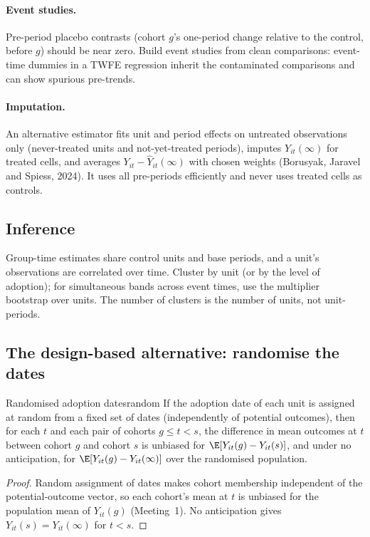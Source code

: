 \documentclass[11pt]{article}
\begin{document}
\paragraph{Event studies.} Pre-period placebo contrasts (cohort $g$'s one-period change relative to the control, before $g$) should be near zero. Build event
studies from clean comparisons: event-time dummies in a TWFE regression inherit the contaminated comparisons and can show spurious pre-trends.

\paragraph{Imputation.} An alternative estimator fits unit and period effects on untreated observations only (never-treated units and not-yet-treated periods),
imputes $Y_{it}(\infty)$ for treated cells, and averages $Y_{it} - \hat Y_{it}(\infty)$ with chosen weights (Borusyak, Jaravel and Spiess, 2024). It uses all
pre-periods efficiently and never uses treated cells as controls.

\subsection{Inference}

Group-time estimates share control units and base periods, and a unit's observations are correlated over time. Cluster by unit (or by the level of adoption);
for simultaneous bands across event times, use the multiplier bootstrap over units. The number of clusters is the number of units, not unit-periods.

\subsection{The design-based alternative: randomise the dates}

\begin{prop}{Randomised adoption dates}{random}
If the adoption date of each unit is assigned at random from a fixed set of dates (independently of potential outcomes), then for each $t$ and each pair of
cohorts $g \le t < s$, the difference in mean outcomes at $t$ between cohort $g$ and cohort $s$ is unbiased for $\E[Y_{it}(g) - Y_{it}(s)]$, and under no
anticipation, for $\E[Y_{it}(g) - Y_{it}(\infty)]$ over the randomised population.
\end{prop}
\begin{proof}
Random assignment of dates makes cohort membership independent of the potential-outcome vector, so each cohort's mean at $t$ is unbiased for the
population mean of $Y_{it}(g)$ (Meeting~1). No anticipation gives $Y_{it}(s) = Y_{it}(\infty)$ for $t < s$.
\end{proof}
\end{document}
